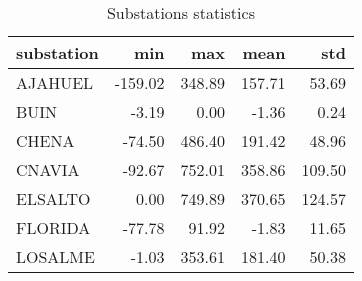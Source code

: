 \begin{table}
\caption{Substations statistics}
\begin{tabular}{lrrrr}
\toprule
substation & min & max & mean & std \\
\midrule
AJAHUEL & -159.02 & 348.89 & 157.71 & 53.69 \\
BUIN & -3.19 & 0.00 & -1.36 & 0.24 \\
CHENA & -74.50 & 486.40 & 191.42 & 48.96 \\
CNAVIA & -92.67 & 752.01 & 358.86 & 109.50 \\
ELSALTO & 0.00 & 749.89 & 370.65 & 124.57 \\
FLORIDA & -77.78 & 91.92 & -1.83 & 11.65 \\
LOSALME & -1.03 & 353.61 & 181.40 & 50.38 \\
\bottomrule
\end{tabular}
\end{table}
